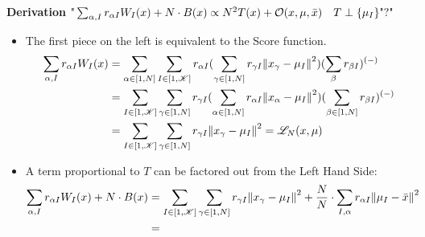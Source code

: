 \begin{frame} [t]
      {\bf Derivation}
    $ \text {"} 
        \sum _{\alpha, I} 
            r _{\alpha I} W _{I} (x)
          + N \cdot B (x) 
          \propto N ^{2} T (x) 
             + \mathcal {O} 
                (x, \mu, \bar {x}) 
          \quad T \perp \qty {\mu _{I}}
      \text {"?"}
    $
\begin{itemize}
    \item The first piece on the left 
        is equivalent to the Score function. 
        { \footnotesize
        \begin{align*}
            \sum _{\alpha, I} 
            r _{\alpha I} W _{I} (x) 
           & = 
            \sum _{\alpha \in [1, N]} 
            \sum _{I \in [1, \mathscr{K}]} 
            r _{\alpha I}
            ( \sum _{\gamma \in [1, N]} 
              r _{\gamma I} 
              \norm {x _{\gamma} - \mu _{I}} 
                   ^{2}
            )
            ( \sum _{\beta} 
            r _{\beta I}  
            )  ^{(-)} 
           \\ & = 
              \sum _{I \in [1, \mathscr{K}]}
              \sum _{\gamma \in [1, N]}
              r _{\gamma I}
              ( \sum _{\alpha \in [1, N]}
                r _{\alpha I} 
                \norm {x _{\alpha} - \mu _{I}} 
                      ^{2}
              )
            ( \sum _{\beta \in [1,N]} 
              r _{\beta I}  
            )  ^{(-)}  
           \\ & = 
              \sum _{I \in [1, \mathscr{K}]}
              \sum _{\gamma \in [1, N]} 
              r _{\gamma I}
              \norm {x _{\gamma} - \mu _{I}} 
                   ^{2} 
           = 
            \mathscr {L} _{N} (x , \mu)
        \end{align*}
        } 
    \item A term proportional to $ T $ can be 
          factored out from the Left Hand Side:
        { \footnotesize
        \begin{align*}
            \sum _{\alpha, I} 
                r _{\alpha I} W _{I} (x)
              + N \cdot B (x)  
            & = 
              \sum _{I \in [1, \mathscr{K}]}
              \sum _{\gamma \in [1, N]} 
              r _{\gamma I}
              \norm {x _{\gamma} - \mu _{I}} 
                   ^{2} 
              + 
               \frac {N} {N} \cdot 
               \sum _{I, \alpha}  
               r _{\alpha I} 
               \norm 
                {\mu _{I} - \bar {x}} ^{2} 
            \\ & = 

\end{align*}}
\end{itemize}
\end{frame}
